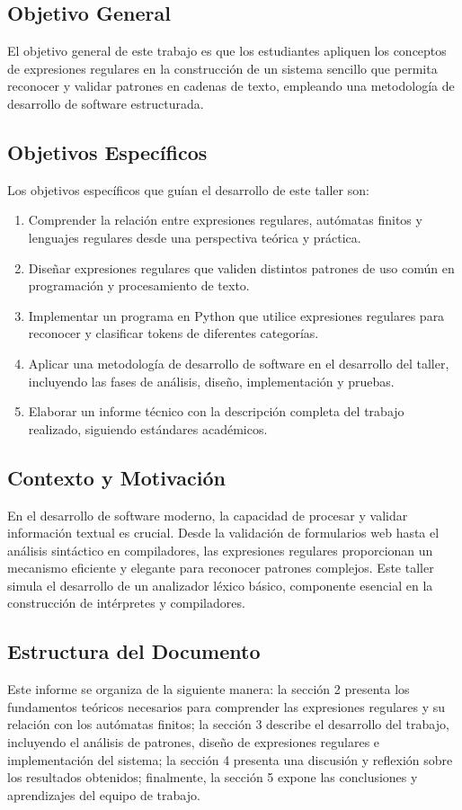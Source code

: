 \documentclass[10pt,letterpaper]{article}
\begin{document}
\subsection{Objetivo General}
El objetivo general de este trabajo es que los estudiantes apliquen los conceptos de expresiones regulares en la construcción de un sistema sencillo que permita reconocer y validar patrones en cadenas de texto, empleando una metodología de desarrollo de software estructurada.

\subsection{Objetivos Específicos}
Los objetivos específicos que guían el desarrollo de este taller son:

\begin{enumerate}
    \item Comprender la relación entre expresiones regulares, autómatas finitos y lenguajes regulares desde una perspectiva teórica y práctica.
    \item Diseñar expresiones regulares que validen distintos patrones de uso común en programación y procesamiento de texto.
    \item Implementar un programa en Python que utilice expresiones regulares para reconocer y clasificar tokens de diferentes categorías.
    \item Aplicar una metodología de desarrollo de software en el desarrollo del taller, incluyendo las fases de análisis, diseño, implementación y pruebas.
    \item Elaborar un informe técnico con la descripción completa del trabajo realizado, siguiendo estándares académicos.
\end{enumerate}

\subsection{Contexto y Motivación}
En el desarrollo de software moderno, la capacidad de procesar y validar información textual es crucial. Desde la validación de formularios web hasta el análisis sintáctico en compiladores, las expresiones regulares proporcionan un mecanismo eficiente y elegante para reconocer patrones complejos. Este taller simula el desarrollo de un analizador léxico básico, componente esencial en la construcción de intérpretes y compiladores.

\subsection{Estructura del Documento}
Este informe se organiza de la siguiente manera: la sección 2 presenta los fundamentos teóricos necesarios para comprender las expresiones regulares y su relación con los autómatas finitos; la sección 3 describe el desarrollo del trabajo, incluyendo el análisis de patrones, diseño de expresiones regulares e implementación del sistema; la sección 4 presenta una discusión y reflexión sobre los resultados obtenidos; finalmente, la sección 5 expone las conclusiones y aprendizajes del equipo de trabajo.
\end{document}
